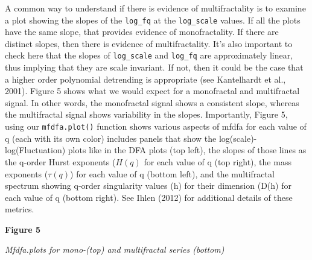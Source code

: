 \documentclass[
  man]{apa6}
\begin{document}
A common way to understand if there is evidence of multifractality is to
examine a plot showing the slopes of the \texttt{log\_fq} at the \texttt{log\_scale}
values. If all the plots have the same slope, that provides evidence of
monofractality. If there are distinct slopes, then there is evidence of
multifractality. It's also important to check here that the slopes of
\texttt{log\_scale} and \texttt{log\_fq} are approximately linear, thus implying that
they are scale invariant. If not, then it could be the case that a
higher order polynomial detrending is appropriate (see Kantelhardt et
al., 2001). Figure 5 shows what we would expect for a monofractal and
multifractal signal. In other words, the monofractal signal shows a
consistent slope, whereas the multifractal signal shows variability in
the slopes. Importantly, Figure 5, using our \texttt{mfdfa.plot()} function
shows various aspects of mfdfa for each value of q (each with its own
color) includes panels that show the log(scale)-log(Fluctuation) plots
like in the DFA plots (top left), the slopes of those lines as the
q-order Hurst exponents (\(H(q)\) for each value of q (top right), the
mass exponents (\(\tau(q)\)) for each value of q (bottom left), and the
multifractal spectrum showing q-order singularity values (h) for their
dimension (D(h) for each value of q (bottom right). See Ihlen (2012) for
additional details of these metrics.

\textbf{Figure 5}

\emph{Mfdfa.plots for mono-(top) and multifractal series (bottom)}
\end{document}
